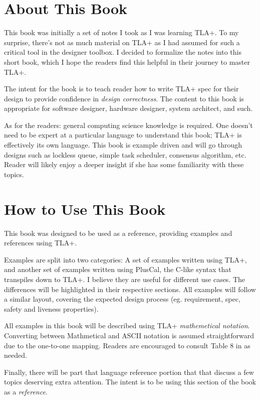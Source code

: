 \section{About This Book}

This book was initially a set of notes I took as I was learning TLA+. To my
surprise, there's not as much material on TLA+ as I had assumed for such a
critical tool in the designer toolbox. I decided to formalize the notes into
this short book, which I hope the readers find this helpful in their journey to
master TLA+.  \newline

The intent for the book is to teach reader how to write TLA+ spec for their
design to provide confidence in \textit{design correctness}. The content to this
book is appropriate for software designer, hardware designer, system architect,
and such.\newline 

As for the readers: general computing science knowledge is required. One doesn't
need to be expert at a particular language to understand this book; TLA+ is
effectively its own language. This book is example driven and will go through
designs such as lockless queue, simple task scheduler, consensus algorithm, etc.
Reader will likely enjoy a deeper insight if she has some familiarity with these
topics.

\section{How to Use This Book}

This book was designed to be used as a reference, providing examples and
references using TLA+.\newline

Examples are split into two categories: A set of examples written using TLA+,
and another set of examples written using PlusCal, the C-like syntax that
transpiles down to TLA+. I believe they are useful for different use cases.  The
differences will be highlighted in their respective sections. All examples will
follow a similar layout, covering the expected design process (eg. requirement,
spec, safety and liveness properties).\newline

All examples in this book will be described using TLA+ \textit{mathemetical
notation}. Converting between Mathmetical and ASCII notation is assumed
straightforward due to the one-to-one mapping. Readers are encouraged to consult
Table 8 in \cite{ss} as needed.\newline

Finally, there will be part that language reference portion that that discuss a
few topics deserving extra attention. The intent is to be using this section of the 
book as a \textit{reference}.

